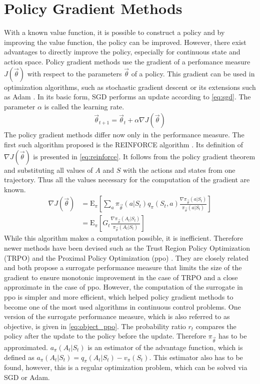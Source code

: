 \section{Policy Gradient Methods}
With a known value function, it is possible to construct a policy and by improving the value function, the policy can be improved. However, there exist advantages to directly improve the policy, especially for continuous state and action space. Policy gradient methods use the gradient of a perfomance measure $J(\vec{\theta})$ with respect to the parameters $\vec{\theta}$ of a policy. This gradient can be used in optimization algorithms, such as stochastic gradient descent \cite[p. 201]{sutton_reinforcement_2018} or its extensions such as Adam \cite{kingma_adam_2017}. In its basic form, SGD performs an update according to \ref{eq:sgd}. The parameter $\alpha$ is called the learning rate.
\begin{align}
	\vec{\theta}_{t+1} = \vec{\theta}_t + \alpha \nabla J(\vec{\theta}) \label{eq:sgd}
\end{align}
The policy gradient methods differ now only in the performance measure. The first such algorithm proposed is the REINFORCE algorithm \cite{williams_simple_1992}. Its definition of $\nabla J(\vec{\theta})$ is presented in \eqref{eq:reinforce}. It follows from the policy gradient theorem and substituting all values of $A$ and $S$ with the actions and states from one trajectory. Thus all the values necessary for the computation of the gradient are known. \cite[p.324-328]{sutton_reinforcement_2018}
\begin{align}
	\nabla J(\vec{\theta}) 
	&= \mathrm{E}_\pi \left[ \sum_{a} \pi_{\vec{\theta}} (a\vert S_t) q_\pi(S_t, a)
	\frac{\nabla \pi_{\vec{\theta}}(a\vert S_t)}{\pi_{\vec{\theta}}(a\vert S_t)} \right]\label{eq:reinforce} \\
	&= \mathrm{E}_\pi \left[G_t \frac{\nabla \pi_{\vec{\theta}}(A_t\vert S_t)}{\pi_{\vec{\theta}}(A_t\vert S_t)} \right] \label{eq:reinforce2}
\end{align}
While this algorithm makes a computation possible, it is inefficient. Therefore newer methods have been devised such as the Trust Region Policy Optimization (TRPO) \cite{schulman_trust_2017} and the Proximal Policy Optimization (ppo) \cite{schulman_proximal_2017}. They are closely related and both propose a surrogate performance measure that limits the size of the gradient to ensure monotonic improvement in the case of TRPO and a close approximate in the case of ppo. However, the computation of the surrogate in ppo is simpler and more efficient, which helped policy gradient methods to become one of the most used algorithms in continuous control problems. One version of the surrogate performance measure, which is also referred to as objective, is given in \eqref{eq:object_ppo}. The probability ratio $r_t$ compares the policy after the update to the policy before the update. Therefore $\pi_{\vec{\theta}}$ has to be approximated. $a_\pi(A_t \vert S_t)$ is an estimator of the advantage function, which is defined as $a_\pi(A_t \vert S_t) = q_\pi(A_t \vert S_t) - v_\pi(S_t)$. This estimator also has to be found, however, this is a regular optimization problem, which can be solved via SGD or Adam.
